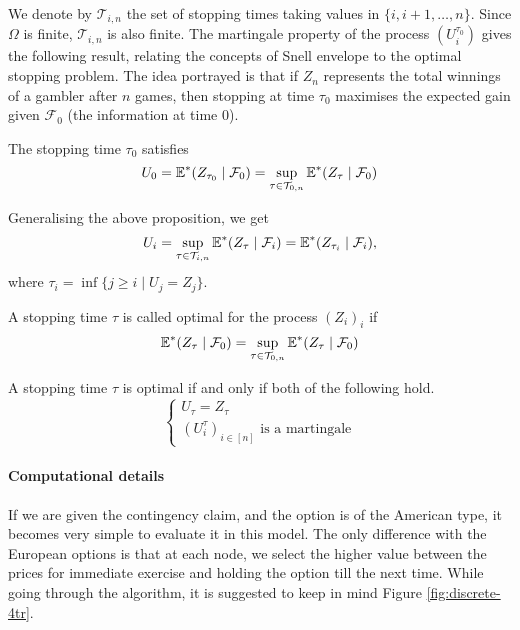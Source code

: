 We denote by $ \mathcal{T}_{i, n} $ the set of stopping times taking values in $ \{ i, i+1, \dots, n \} $. Since $ \Omega $ is finite, $ \mathcal{T}_{i, n} $ is also finite. The martingale property of the process $ (U_i^{\tau_0}) $ gives the following result, relating the concepts of Snell envelope to the optimal stopping problem. The idea portrayed is that if $ Z_n $ represents the total winnings of a gambler after $ n $ games, then stopping at time $ \tau_0 $ maximises the expected gain given $ \mathcal{F}_0 $ (the information at time 0).

\begin{prp}
	The stopping time $ \tau_0 $ satisfies
	\begin{equation*}
		U_0  =  \operatorname{\mathbb{E}}^* ( Z_{\tau_0} \mid \mathcal{F}_0 )  =  \sup_{ \tau \in \mathcal{T}_{0, n} } \operatorname{\mathbb{E}}^* ( Z_{\tau} \mid \mathcal{F}_0 )
	\end{equation*}
\end{prp}

Generalising the above proposition, we get
\begin{equation}
	U_i  =  \sup_{ \tau \in \mathcal{T}_{i, n} } \operatorname{\mathbb{E}}^* ( Z_{\tau} \mid \mathcal{F}_i )  =  \operatorname{\mathbb{E}}^* ( Z_{\tau_i} \mid \mathcal{F}_i ) ,
\end{equation}
where $ \tau_i = \inf \{ j \ge i \mid U_j = Z_j \} $.

\begin{dfn}
	\label{dfn:discrete-optimal-stopping-time}
	A stopping time $ \tau $ is called optimal for the process $ (Z_i)_i $ if
	\begin{equation}
		\operatorname{\mathbb{E}}^* ( Z_{\tau} \mid \mathcal{F}_0 )  =  \sup_{ \tau \in \mathcal{T}_{0, n} } \operatorname{\mathbb{E}}^* ( Z_{\tau} \mid \mathcal{F}_0 )
	\end{equation}
\end{dfn}

\begin{thm}
	A stopping time $ \tau $ is optimal if and only if both of the following hold.
	\begin{equation*}
		\begin{cases}
			U_{\tau}  =  Z_{\tau}  \\
			(U_i^{\tau})_{i \in [n]}  \text{ is a martingale}
		\end{cases}
	\end{equation*}
\end{thm}



\paragraph{Computational details}
If we are given the contingency claim, and the option is of the American type, it becomes very simple to evaluate it in this model. The only difference with the European options is that at each node, we select the higher value between the prices for immediate exercise and holding the option till the next time. While going through the algorithm, it is suggested to keep in mind Figure \ref{fig:discrete-4tr}.

